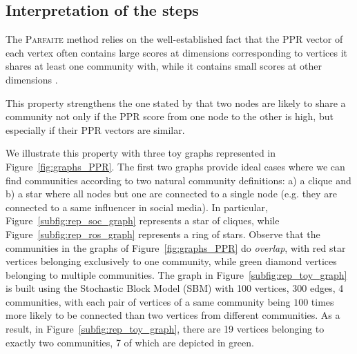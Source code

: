 \subsection{Interpretation of the steps}\label{subsec:interpretation}


The \textsc{Parfaite} method relies on the well-established fact that the PPR vector of each vertex often contains large scores at dimensions corresponding to vertices it shares at least one community with, while it contains small scores at other dimensions \cite{Hollocou2017,Kloumann2014}. %

This property strengthens the one stated by \cite{zhang_2020} that two nodes are likely to share a community not only if the PPR score from one node to the other is high, but especially if their PPR vectors are similar.%


We illustrate this property with three toy graphs represented in Figure~\ref{fig:graphs_PPR}. The first two graphs provide ideal cases where we can find communities according to two natural community definitions: a) a clique %
and b) a star where all nodes but one are connected to a single node (e.g. they are connected to a same influencer in social media). In particular, Figure~\ref{subfig:rep_soc_graph} represents a star of cliques, while Figure~\ref{subfig:rep_ros_graph} represents a ring of stars. Observe that the communities in the graphs of Figure~\ref{fig:graphs_PPR} do \emph{overlap}, with red star vertices belonging exclusively to one community, while green diamond vertices belonging to multiple communities. The graph in Figure~\ref{subfig:rep_toy_graph} is built using the Stochastic Block Model (SBM) with 100 vertices, 300 edges, 4 communities, with each pair of vertices of a same community being $100$ times more likely to be connected than two vertices from different communities. As a result, in Figure~\ref{subfig:rep_toy_graph},  there are 19 vertices belonging to exactly two communities, 7 of which are depicted in green. 

